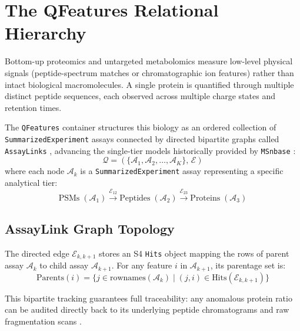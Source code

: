 \documentclass[11pt,twoside,openright]{book}
\begin{document}
\section{The QFeatures Relational Hierarchy}
\label{sec:qfeatures_hierarchy}

Bottom-up proteomics and untargeted metabolomics measure low-level physical signals (peptide-spectrum matches or chromatographic ion features) rather than intact biological macromolecules. A single protein is quantified through multiple distinct peptide sequences, each observed across multiple charge states and retention times.

The \texttt{QFeatures} container structures this biology as an ordered collection of \texttt{SummarizedExperiment} assays connected by directed bipartite graphs called \texttt{AssayLinks} \cite{gatto2023qfeatures, vanderaa2021reproducible}, advancing the single-tier models historically provided by \texttt{MSnbase} \cite{gatto2012msnbase}:
\begin{equation}
\mathcal{Q} = \left( \{ \mathcal{A}_1, \mathcal{A}_2, \dots, \mathcal{A}_K \}, \, \mathcal{E} \right)
\end{equation}
where each node $\mathcal{A}_k$ is a \texttt{SummarizedExperiment} assay representing a specific analytical tier:
\begin{equation}
\text{PSMs} \; (\mathcal{A}_1) \xrightarrow{\mathcal{E}_{12}} \text{Peptides} \; (\mathcal{A}_2) \xrightarrow{\mathcal{E}_{23}} \text{Proteins} \; (\mathcal{A}_3)
\end{equation}

\subsection{AssayLink Graph Topology}

The directed edge $\mathcal{E}_{k, k+1}$ stores an S4 \texttt{Hits} object mapping the rows of parent assay $\mathcal{A}_k$ to child assay $\mathcal{A}_{k+1}$. For any feature $i$ in $\mathcal{A}_{k+1}$, its parentage set is:
\begin{equation}
\text{Parents}(i) = \{ j \in \text{rownames}(\mathcal{A}_k) \mid (j, i) \in \text{Hits}(\mathcal{E}_{k, k+1}) \}
\end{equation}

This bipartite tracking guarantees full traceability: any anomalous protein ratio can be audited directly back to its underlying peptide chromatograms and raw fragmentation scans \cite{martens2011mzml, wilkinson2016fair}.
\end{document}
